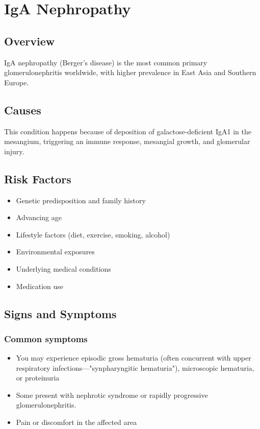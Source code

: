\chapter{IgA Nephropathy}
\label{sec:IgA Nephropathy}

\section{Overview}
IgA nephropathy (Berger's disease) is the most common primary glomerulonephritis worldwide, with higher prevalence in East Asia and Southern Europe.
\section{Causes}
This condition happens because of deposition of galactose-deficient IgA1 in the mesangium, triggering an immune response, mesangial growth, and glomerular injury.     
\section{Risk Factors}

\begin{itemize}[noitemsep]
  \item Genetic predisposition and family history
  \item Advancing age
  \item Lifestyle factors (diet, exercise, smoking, alcohol)
  \item Environmental exposures
  \item Underlying medical conditions
  \item Medication use
\end{itemize}
\section{Signs and Symptoms}

\subsection{Common symptoms}
\begin{itemize}[noitemsep]
  \item You may experience episodic gross hematuria (often concurrent with upper respiratory infections---"synpharyngitic hematuria"), microscopic hematuria, or proteinuria
  \item Some present with nephrotic syndrome or rapidly progressive glomerulonephritis.
  \item Pain or discomfort in the affected area
  \end{itemize}

